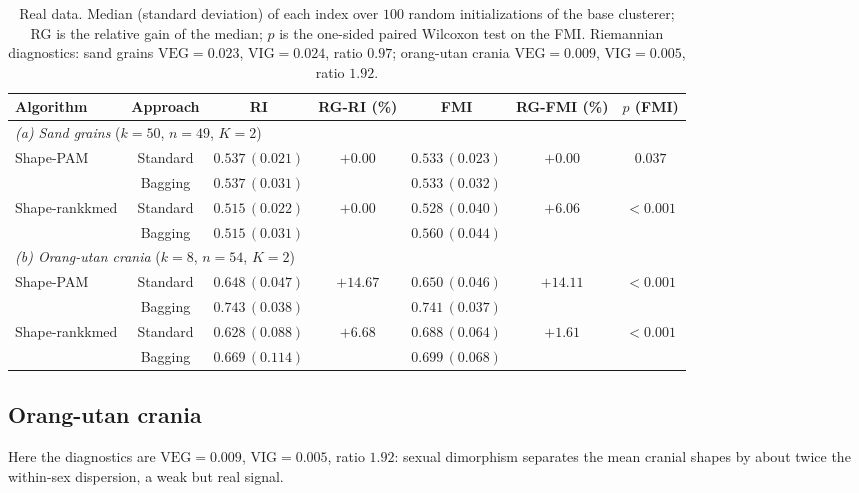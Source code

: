 \documentclass[review,11pt,3p,authoryear]{elsarticle}
\newcommand{\rmVEG}{\mathrm{VEG}}
\newcommand{\rmVIG}{\mathrm{VIG}}
\begin{document}
\begin{table}[!htbp]
\centering
\caption{Real data. Median (standard deviation) of each index over $100$
  random initializations of the base clusterer; RG is the relative gain of
  the median; $p$ is the one-sided paired Wilcoxon test on the FMI.
  Riemannian diagnostics: sand grains $\rmVEG=0.023$, $\rmVIG=0.024$,
  ratio $0.97$; orang-utan crania $\rmVEG=0.009$, $\rmVIG=0.005$, ratio
  $1.92$.}
\label{tab:sand}
\small
\begin{tabular}{lc cc cc c}
\toprule
Algorithm & Approach & RI & RG-RI (\%) & FMI & RG-FMI (\%) & $p$ (FMI) \\
\midrule
\multicolumn{7}{l}{\emph{(a) Sand grains} ($k=50$, $n=49$, $K=2$)}\\
\multirow{2}{*}{Shape-PAM} & Standard & $0.537\,(0.021)$ & \multirow{2}{*}{$+0.00$} & $0.533\,(0.023)$ & \multirow{2}{*}{$+0.00$} & \multirow{2}{*}{$\mathbf{0.037}$} \\
 & Bagging & $0.537\,(0.031)$ & & $0.533\,(0.032)$ & & \\
\multirow{2}{*}{Shape-rankkmed} & Standard & $0.515\,(0.022)$ & \multirow{2}{*}{$+0.00$} & $0.528\,(0.040)$ & \multirow{2}{*}{$+6.06$} & \multirow{2}{*}{$\mathbf{<\!0.001}$} \\
 & Bagging & $0.515\,(0.031)$ & & $0.560\,(0.044)$ & & \\
\midrule
\multicolumn{7}{l}{\emph{(b) Orang-utan crania} ($k=8$, $n=54$, $K=2$)}\\
\multirow{2}{*}{Shape-PAM} & Standard & $0.648\,(0.047)$ & \multirow{2}{*}{$+14.67$} & $0.650\,(0.046)$ & \multirow{2}{*}{$+14.11$} & \multirow{2}{*}{$\mathbf{<\!0.001}$} \\
 & Bagging & $0.743\,(0.038)$ & & $0.741\,(0.037)$ & & \\
\multirow{2}{*}{Shape-rankkmed} & Standard & $0.628\,(0.088)$ & \multirow{2}{*}{$+6.68$} & $0.688\,(0.064)$ & \multirow{2}{*}{$+1.61$} & \multirow{2}{*}{$\mathbf{<\!0.001}$} \\
 & Bagging & $0.669\,(0.114)$ & & $0.699\,(0.068)$ & & \\
\bottomrule
\end{tabular}
\end{table}

\subsection{Orang-utan crania}
\label{subsec:realdata:orang}

Here the diagnostics are $\rmVEG=0.009$, $\rmVIG=0.005$, ratio $1.92$:
sexual dimorphism separates the mean cranial shapes by about twice the
within-sex dispersion, a weak but real signal.
\end{document}
